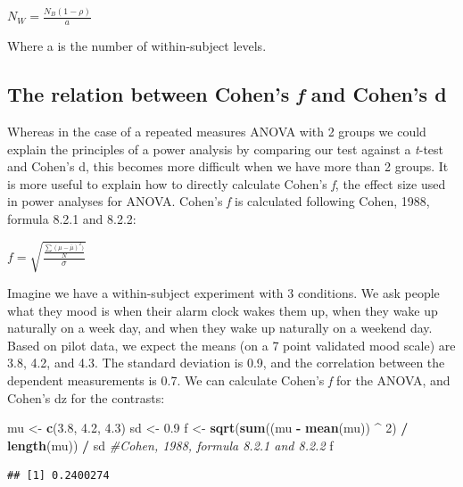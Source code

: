 \documentclass[]{book}
\newenvironment{Shaded}{\begin{snugshade}}{\end{snugshade}}
\newcommand{\CommentTok}[1]{\textcolor[rgb]{0.56,0.35,0.01}{\textit{#1}}}
\newcommand{\DecValTok}[1]{\textcolor[rgb]{0.00,0.00,0.81}{#1}}
\newcommand{\FloatTok}[1]{\textcolor[rgb]{0.00,0.00,0.81}{#1}}
\newcommand{\KeywordTok}[1]{\textcolor[rgb]{0.13,0.29,0.53}{\textbf{#1}}}
\newcommand{\NormalTok}[1]{#1}
\newcommand{\OperatorTok}[1]{\textcolor[rgb]{0.81,0.36,0.00}{\textbf{#1}}}
\newcommand{\StringTok}[1]{\textcolor[rgb]{0.31,0.60,0.02}{#1}}
\begin{document}
\(N_{W}=\frac{N_{B}(1-\rho)}{a}\)

Where a is the number of within-subject levels.

\hypertarget{the-relation-between-cohens-f-and-cohens-d}{%
\subsection{\texorpdfstring{The relation between Cohen's \emph{f} and Cohen's d}{The relation between Cohen's f and Cohen's d}}\label{the-relation-between-cohens-f-and-cohens-d}}

Whereas in the case of a repeated measures ANOVA with 2 groups we could explain the principles of a power analysis by comparing our test against a \emph{t}-test and Cohen's d, this becomes more difficult when we have more than 2 groups. It is more useful to explain how to directly calculate Cohen's \emph{f}, the effect size used in power analyses for ANOVA. Cohen's \emph{f} is calculated following Cohen, 1988, formula 8.2.1 and 8.2.2:

\(f = \sqrt{\frac{\frac{\sum(\mu-\overline{\mu})^2)}N}\sigma}\)

Imagine we have a within-subject experiment with 3 conditions. We ask people what they mood is when their alarm clock wakes them up, when they wake up naturally on a week day, and when they wake up naturally on a weekend day. Based on pilot data, we expect the means (on a 7 point validated mood scale) are 3.8, 4.2, and 4.3. The standard deviation is 0.9, and the correlation between the dependent measurements is 0.7. We can calculate Cohen's \emph{f} for the ANOVA, and Cohen's dz for the contrasts:

\begin{Shaded}
\begin{Highlighting}[]
\NormalTok{mu <-}\StringTok{ }\KeywordTok{c}\NormalTok{(}\FloatTok{3.8}\NormalTok{, }\FloatTok{4.2}\NormalTok{, }\FloatTok{4.3}\NormalTok{)}
\NormalTok{sd <-}\StringTok{ }\FloatTok{0.9}
\NormalTok{f <-}\StringTok{ }\KeywordTok{sqrt}\NormalTok{(}\KeywordTok{sum}\NormalTok{((mu }\OperatorTok{-}\StringTok{ }\KeywordTok{mean}\NormalTok{(mu)) }\OperatorTok{^}\StringTok{ }\DecValTok{2}\NormalTok{) }\OperatorTok{/}\StringTok{ }\KeywordTok{length}\NormalTok{(mu)) }\OperatorTok{/}\StringTok{ }\NormalTok{sd }
\CommentTok{#Cohen, 1988, formula 8.2.1 and 8.2.2}
\NormalTok{  f}
\end{Highlighting}
\end{Shaded}

\begin{verbatim}
## [1] 0.2400274
\end{verbatim}
\end{document}
